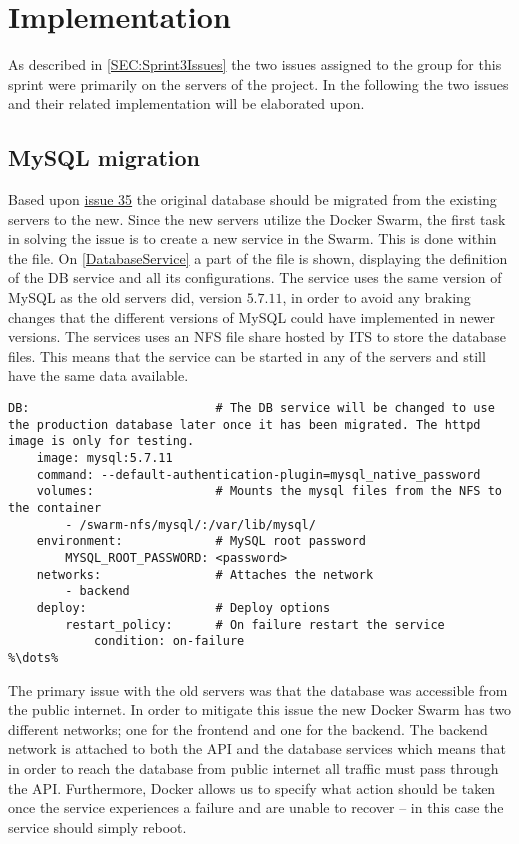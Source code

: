 \section{Implementation}
As described in \autoref{SEC:Sprint3Issues} the two issues assigned to the group for this sprint were primarily on the servers of the project.
In the following the two issues and their related implementation will be elaborated upon.

\subsection{MySQL migration}
Based upon \href{https://github.com/aau-giraf/wiki/issues/35}{issue 35} the original database should be migrated from the existing servers to the new.
Since the new servers utilize the Docker Swarm, the first task in solving the issue is to create a new service in the Swarm.
This is done within the  file.
On \autoref{DatabaseService} a part of the file is shown, displaying the definition of the DB service and all its configurations.
The service uses the same version of MySQL as the old servers did, version $5.7.11$, in order to avoid any braking changes that the different versions of MySQL could have implemented in newer versions.
The services uses an NFS file share hosted by ITS to store the database files.
This means that the service can be started in any of the servers and still have the same data available.

\begin{lstlisting}[caption={Docker database service},captionpos=b,label=DatabaseService,escapechar=\%]
%\dots%
DB:                          # The DB service will be changed to use the production database later once it has been migrated. The httpd image is only for testing.
    image: mysql:5.7.11
    command: --default-authentication-plugin=mysql_native_password
    volumes:                 # Mounts the mysql files from the NFS to the container
        - /swarm-nfs/mysql/:/var/lib/mysql/
    environment:             # MySQL root password
        MYSQL_ROOT_PASSWORD: <password>
    networks:                # Attaches the network
        - backend
    deploy:                  # Deploy options
        restart_policy:      # On failure restart the service
            condition: on-failure
%\dots%
\end{lstlisting}

The primary issue with the old servers was that the database was accessible from the public internet.
In order to mitigate this issue the new Docker Swarm has two different networks; one for the frontend and one for the backend.
The backend network is attached to both the API and the database services which means that in order to reach the database from public internet all traffic must pass through the API.
Furthermore, Docker allows us to specify what action should be taken once the service experiences a failure and are unable to recover -- in this case the service should simply reboot.

